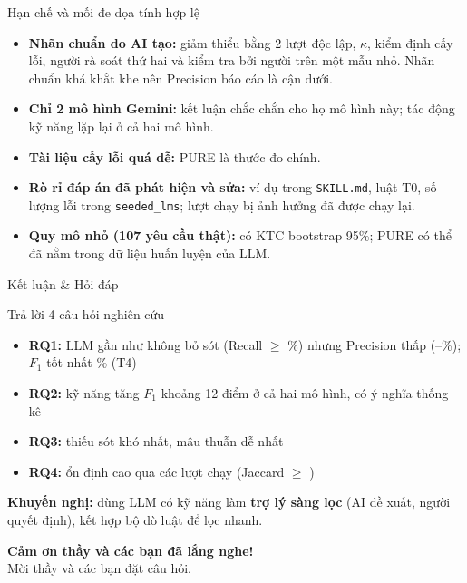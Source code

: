 \documentclass[aspectratio=169,10pt]{beamer}
\begin{document}
\begin{frame}{Hạn chế và mối đe dọa tính hợp lệ}
  \begin{itemize}
    \item \textbf{Nhãn chuẩn do AI tạo:} giảm thiểu bằng 2 lượt độc lập, $\kappa$, kiểm định cấy lỗi, người rà soát thứ hai và kiểm tra bởi người trên một mẫu nhỏ. Nhãn chuẩn khá khắt khe nên Precision báo cáo là cận dưới.
    \item \textbf{Chỉ 2 mô hình Gemini:} kết luận chắc chắn cho họ mô hình này; tác động kỹ năng lặp lại ở cả hai mô hình.
    \item \textbf{Tài liệu cấy lỗi quá dễ:} PURE là thước đo chính.
    \item \textbf{Rò rỉ đáp án đã phát hiện và sửa:} ví dụ trong \texttt{SKILL.md}, luật T0, số lượng lỗi trong \texttt{seeded\_lms}; lượt chạy bị ảnh hưởng đã được chạy lại.
    \item \textbf{Quy mô nhỏ (107 yêu cầu thật):} có KTC bootstrap 95\%; PURE có thể đã nằm trong dữ liệu huấn luyện của LLM.
  \end{itemize}
\end{frame}

\begin{frame}{Kết luận \& Hỏi đáp}
  \begin{block}{Trả lời 4 câu hỏi nghiên cứu}
    \begin{itemize}\small
      \item \textbf{RQ1:} LLM gần như không bỏ sót (Recall $\ge$ \numRTfour\%) nhưng Precision thấp (\numPTone--\numPTfour\%); $F_1$ tốt nhất \numFTfour\% (T4)
      \item \textbf{RQ2:} kỹ năng tăng $F_1$ khoảng 12 điểm ở cả hai mô hình, có ý nghĩa thống kê
      \item \textbf{RQ3:} thiếu sót khó nhất, mâu thuẫn dễ nhất
      \item \textbf{RQ4:} ổn định cao qua các lượt chạy (Jaccard $\ge$ \numJacTtwo)
    \end{itemize}
    \textbf{Khuyến nghị:} dùng LLM có kỹ năng làm \textbf{trợ lý sàng lọc} (AI đề xuất, người quyết định), kết hợp bộ dò luật để lọc nhanh.
  \end{block}
  \centering
  \vspace{0.2cm}
  {\Large\bfseries\color{hustred} Cảm ơn thầy và các bạn đã lắng nghe!}\\[0.1cm]
  {\small Mời thầy và các bạn đặt câu hỏi.}
\end{frame}
\end{document}
